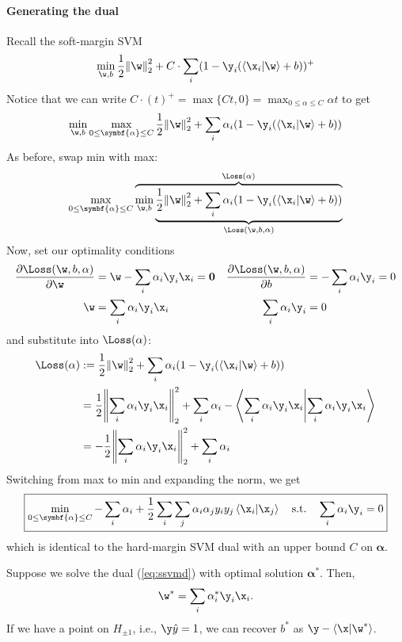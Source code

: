 \documentclass[class=cs480,notes,tikz]{agony}
\begin{document}
\paragraph{Generating the dual}
Recall the soft-margin SVM
\[
  \min_{\w,b} \frac12\norm{\w}^2_2
  + C\cdot \sum_i(1-\y_i(\ip{\x_i}{\w}+b))^+
\]
Notice that we can write
$C\cdot(t)^+ = \max\{Ct,0\} = \max_{0 \leq \alpha \leq C} \alpha t$
to get
\[
  \min_{\w,b} \max_{0 \leq \symbf{\alpha} \leq C}
  \frac12\norm{\w}^2_2
  + \sum_i\alpha_i(1-\y_i(\ip{\x_i}{\w}+b))
\]
As before, swap min with max:
\[
  \max_{0 \leq \symbf{\alpha} \leq C} \overbrace{
    \min_{\w,b} \underbrace{
      \frac12\norm{\w}^2_2 + \sum_i\alpha_i(1-\y_i(\ip{\x_i}{\w}+b))
    }_{\Loss(\w,b,\alpha)}
  }^{\Loss(\alpha)}
\]
Now, set our optimality conditions
\begin{align*}
  \pdv{\Loss(\w,b,\alpha)}{\w} & = \w - \sum_i \alpha_i \y_i \x_i = \vb 0 &
  \pdv{\Loss(\w,b,\alpha)}{b}  & = -\sum_i \alpha_i \y_i = 0                \\
  \w                           & = \sum_i \alpha_i \y_i \x_i              &
  \sum_i\alpha_i\y_i           & = 0
\end{align*}
and substitute into $\Loss(\alpha)$:
\begin{align*}
  \Loss(\alpha)
   & := \frac12\norm{\w}^2_2 + \sum_i\alpha_i(1-\y_i(\ip{\x_i}{\w}+b))                              \\
   & = \frac12\norm{\sum_i \alpha_i \y_i \x_i}^2_2 + \sum_i\alpha_i - \ip{\sum_i \alpha_i \y_i\x_i} \\
   & = -\frac12\norm{\sum_i \alpha_i \y_i \x_i}^2_2 + \sum_i \alpha_i
\end{align*}
Switching from max to min and expanding the norm, we get
\begin{equation}\label{eq:ssvmd}
  \boxed{
    \min_{0 \leq \symbf{\alpha} \leq C}
    -\sum_i \alpha_i +
    \frac12 \sum_i \sum_j \alpha_i \alpha_j y_i y_j \ip{\x_i}{\x_j}
    \qq{s.t.}
    \sum_i \alpha_i \y_i = 0
  }
\end{equation}
which is identical to the hard-margin SVM dual with an upper bound $C$ on $\symbf\alpha$.


Suppose we solve the dual (\cref{eq:ssvmd}) with optimal solution $\symbf\alpha^*$.
Then,
\begin{equation}\label{eq:ssvmw}
  \w^* = \sum_i \alpha^*_i \y_i \x_i.
\end{equation}
If we have a point on $H_{\pm 1}$, i.e., $\y\hat y = 1$,
we can recover $b^*$ as $\y - \ip{\x}{\w^*}$.
\end{document}
